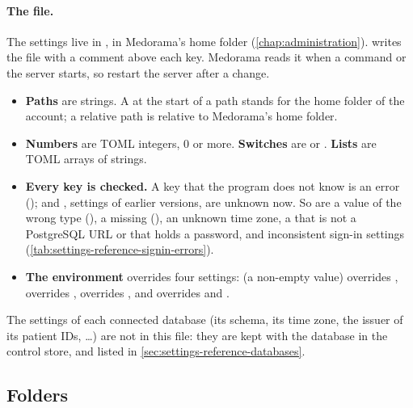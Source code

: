 \paragraph{The file.} The settings live in , in Medorama's home
folder (\cref{chap:administration}).  writes the file with a comment above
each key. Medorama reads it when a command or the server starts, so restart the server after a
change.
\begin{itemize}
\item \textbf{Paths} are strings. A \code{\textasciitilde} at the start of a path stands for
  the home folder of the account; a relative path is relative to Medorama's home folder.
\item \textbf{Numbers} are TOML integers, 0 or more. \textbf{Switches} are  or
  . \textbf{Lists} are TOML arrays of strings.
\item \textbf{Every key is checked.} A key that the program does not know is an error
  ();  and ,
  settings of earlier versions, are unknown now. So are a value of the wrong type
  (), a missing 
  (), an unknown time zone, a  that is not a
  PostgreSQL URL or that holds a password, and inconsistent sign-in settings
  (\cref{tab:settings-reference-signin-errors}).
\item \textbf{The environment} overrides four settings:  (a
  non-empty value) overrides ,  overrides
  ,  overrides , and
   overrides  and
  .
\end{itemize}

The settings of each connected database (its schema, its time zone, the issuer of its patient
IDs, \dots) are not in this file: they are kept with the database in the control store, and
listed in \cref{sec:settings-reference-databases}.

\subsection{Folders}
\label{sec:settings-reference-folders}

